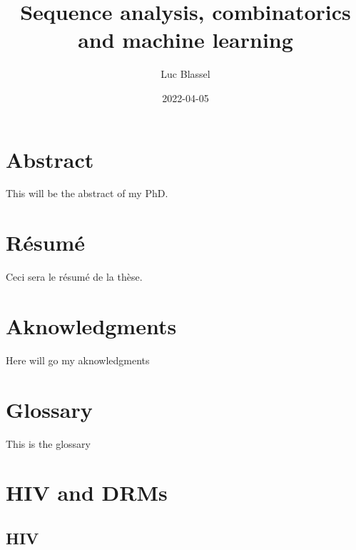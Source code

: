 \documentclass[
  11,
]{scrbook}
\title{Sequence analysis, combinatorics and machine learning}
\author{Luc Blassel}
\date{2022-04-05}
\begin{document}
\maketitle


\pagestyle{empty}
\frontmatter

\chapter{Abstract}
This will be the abstract of my PhD. 
\lipsum[1-3]

\chapter{Résumé}
Ceci sera le résumé de la thèse. 
\lipsum[4-7]

\chapter{Aknowledgments}
Here will go my aknowledgments
\lipsum[7-9]

\chapter{Glossary}
This is the glossary

\mainmatter

{
\setcounter{tocdepth}{1}
\tableofcontents
}
\listoffigures
\listoftables
\pagestyle{empty}

\pagestyle{fancy}
\fancyhf{}
\fancyhead[RO]{\rightmark}
\fancyfoot[CO,CE]{\thepage}

\hypertarget{hiv-and-drms}{%
\chapter{HIV and DRMs}\label{hiv-and-drms}}

\hypertarget{hiv}{%
\section{HIV}\label{hiv}}
\end{document}
